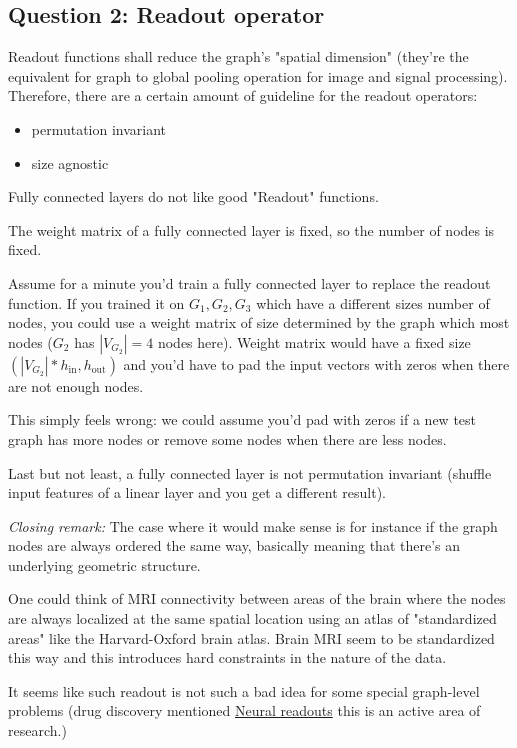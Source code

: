 \documentclass[a4paper]{article}
\begin{document}
\subsection*{Question 2: Readout operator}
Readout functions shall reduce the graph's "spatial dimension" (they're the equivalent for graph to global pooling operation for image and signal processing).
Therefore, there are a certain amount of guideline for the readout operators:
\begin{itemize}
    \item permutation invariant
    \item size agnostic
\end{itemize} 
Fully connected layers do not like good "Readout" functions.

The weight matrix of a fully connected layer is fixed, so the number of nodes is fixed.

Assume for a minute you'd train a fully connected layer to replace the readout function. If you trained it on $G_1, G_2, G_3$ which have a different sizes number of nodes,
you could use a weight matrix of size determined by the graph which most nodes ($G_2$ has $|V_{G_2}|=4$ nodes here).
Weight matrix would have a fixed size $(|V_{G_2}|*h_{\text{in}}, h_{\text{out}} )$ and you'd have to pad the input vectors with zeros when there are not enough nodes.

This simply feels wrong: we could assume you'd pad with zeros if a new test graph has more nodes or remove some nodes when there are less nodes.

Last but not least, a fully connected layer is not permutation invariant (shuffle input features of a linear layer and you get a different result).

\textit{Closing remark:}
The case where it would make sense is for instance if the graph nodes are always ordered the same way, basically meaning that there's an underlying geometric structure.

One could think of MRI connectivity between areas of the brain where the nodes are always localized at the same spatial location using an atlas of "standardized areas" like the Harvard-Oxford brain atlas.
Brain MRI seem to be standardized this way and this introduces hard constraints in the nature of the data.


It seems like such readout is not such a bad idea for some special graph-level problems (drug discovery mentioned \href{https://github.com/davidbuterez/gnn-neural-readouts}{Neural readouts} this is an active area of research.)
\end{document}

